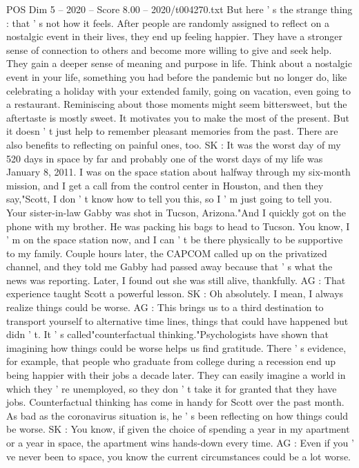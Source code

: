 \begin{textsample}{POS Dim 5 – 2020 – Score 8.00 – 2020/t004270.txt}
But here ' s the strange thing : that ' s not how it feels.
After people are randomly assigned to reflect on a nostalgic event in their lives, they end up feeling happier.
They have a stronger sense of connection to others and become more willing to give and seek help.
They gain a deeper sense of meaning and purpose in life.
Think about a nostalgic event in your life, something you had before the pandemic but no longer do, like celebrating a holiday with your extended family, going on vacation, even going to a restaurant.
Reminiscing about those moments might seem bittersweet, but the aftertaste is mostly sweet.
It motivates you to make the most of the present.
But it doesn ' t just help to remember pleasant memories from the past.
There are also benefits to reflecting on painful ones, too.
SK : It was the worst day of my 520 days in space by far and probably one of the worst days of my life was January 8, 2011.
I was on the space station about halfway through my six-month mission, and I get a call from the control center in Houston, and then they say,"Scott, I don ' t know how to tell you this, so I ' m just going to tell you.
Your sister-in-law Gabby was shot in Tucson, Arizona."And I quickly got on the phone with my brother.
He was packing his bags to head to Tucson.
You know, I ' m on the space station now, and I can ' t be there physically to be supportive to my family.
Couple hours later, the CAPCOM called up on the privatized channel, and they told me Gabby had passed away because that ' s what the news was reporting.
Later, I found out she was still alive, thankfully.
AG : That experience taught Scott a powerful lesson.
SK : Oh absolutely.
I mean, I always realize things could be worse.
AG : This brings us to a third destination to transport yourself to alternative time lines, things that could have happened but didn ' t.
It ' s called"counterfactual thinking."Psychologists have shown that imagining how things could be worse helps us find gratitude.
There ' s evidence, for example, that people who graduate from college during a recession end up being happier with their jobs a decade later.
They can easily imagine a world in which they ' re unemployed, so they don ' t take it for granted that they have jobs.
Counterfactual thinking has come in handy for Scott over the past month.
As bad as the coronavirus situation is, he ' s been reflecting on how things could be worse.
SK : You know, if given the choice of spending a year in my apartment or a year in space, the apartment wins hands-down every time.
AG : Even if you ' ve never been to space, you know the current circumstances could be a lot worse.

\end{textsample}
